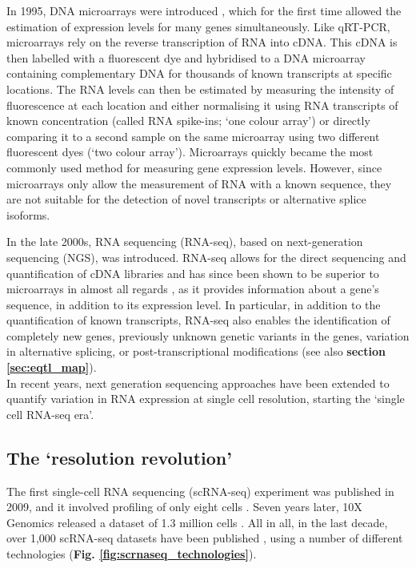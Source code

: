 In 1995, DNA microarrays were introduced \cite{schena1995quantitative}, which for the first time allowed the estimation of expression levels for many genes simultaneously.
Like qRT-PCR, microarrays rely on the reverse transcription of RNA into cDNA.
This cDNA is then labelled with a fluorescent dye and hybridised to a DNA microarray containing complementary DNA for thousands of known transcripts at specific locations. 
The RNA levels can then be estimated by measuring the intensity of fluorescence at each location and either normalising it using RNA transcripts of known concentration (called RNA spike-ins; `one colour array') or directly comparing it to a second sample on the same microarray using two different fluorescent dyes (`two colour array').
Microarrays quickly became the most commonly used method for measuring gene expression levels. 
However, since microarrays only allow the measurement of RNA with a known sequence, they are not suitable for the detection of novel transcripts or alternative splice isoforms. 

In the late 2000s, RNA sequencing (RNA-seq), based on next-generation sequencing (NGS), was introduced.
RNA-seq allows for the direct sequencing and quantification of cDNA libraries \cite{mortazavi2008mapping} and has since been shown to be superior to microarrays in almost all regards \cite{marioni2008rna}, as it provides information about a gene's sequence, in addition to its expression level.
In particular, in addition to the quantification of known transcripts, RNA-seq also enables the identification of completely new genes, previously unknown genetic variants in the genes, variation in alternative splicing, or post-transcriptional modifications (see also \textbf{section \ref{sec:eqtl_map}}).
\\

In recent years, next generation sequencing approaches have been extended to quantify variation in RNA expression at single cell resolution, starting the `single cell RNA-seq era'.

\subsection{The `resolution revolution'}
\label{sec:scrnaseq}

The first single-cell RNA sequencing (scRNA-seq) experiment was published in 2009, and it involved profiling of only eight cells \cite{tang2009mrna}. 
Seven years later, 10X Genomics released a dataset of 1.3 million cells \cite{102016our}.
All in all, in the last decade, over 1,000 scRNA-seq datasets have been published \cite{svensson2018exponential, svensson2019curated, svensson2020single}, using a number of different technologies \cite{islam2011characterization, hashimshony2012cel, ramskold2012full, picelli2013smart, sasagawa2013quartz, jaitin2014massively, macosko2015highly,klein2015droplet, gierahn2017seq, zheng2017massively, hagemann2020single}
(\textbf{Fig. \ref{fig:scrnaseq_technologies}}). \\

